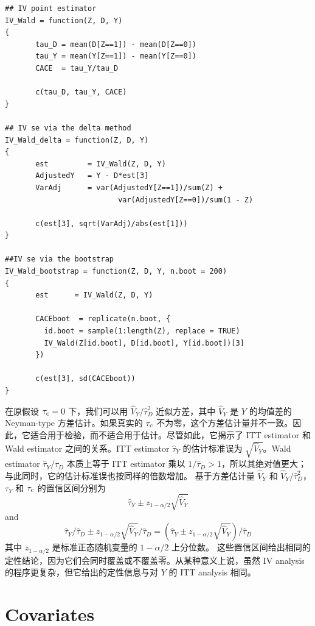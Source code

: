 \begin{lstlisting}
## IV point estimator
IV_Wald = function(Z, D, Y)
{
       tau_D = mean(D[Z==1]) - mean(D[Z==0])
       tau_Y = mean(Y[Z==1]) - mean(Y[Z==0])
       CACE  = tau_Y/tau_D
       
       c(tau_D, tau_Y, CACE)
}

## IV se via the delta method
IV_Wald_delta = function(Z, D, Y)
{
       est         = IV_Wald(Z, D, Y)
       AdjustedY   = Y - D*est[3]
       VarAdj      = var(AdjustedY[Z==1])/sum(Z) + 
                          var(AdjustedY[Z==0])/sum(1 - Z)
       
       c(est[3], sqrt(VarAdj)/abs(est[1]))
}

##IV se via the bootstrap
IV_Wald_bootstrap = function(Z, D, Y, n.boot = 200)
{
       est      = IV_Wald(Z, D, Y)
       
       CACEboot  = replicate(n.boot, {
         id.boot = sample(1:length(Z), replace = TRUE)
         IV_Wald(Z[id.boot], D[id.boot], Y[id.boot])[3]
       })
       
       c(est[3], sd(CACEboot))
}
\end{lstlisting}


在原假设 $\tau_{\textup{c}} = 0$ 下，我们可以用 $\hat{V}_Y /  \hat{\tau}_D ^2$ 近似方差，其中 $\hat{V}_Y$ 是 $Y$ 的均值差的 Neyman-type 方差估计。如果真实的 $\tau_{\textup{c}}$ 不为零，这个方差估计量并不一致。因此，它适合用于检验，而不适合用于估计。尽管如此，它揭示了 ITT estimator 和 Wald estimator 之间的关系。ITT estimator $\hat{\tau}_Y$ 的估计标准误为 $\sqrt{ \hat{V}_Y}$。Wald estimator $ \hat{\tau}_Y / \hat{\tau}_D$ 本质上等于 ITT estimator 乘以 $1/\hat{\tau}_D > 1$，所以其绝对值更大；与此同时，它的估计标准误也按同样的倍数增加。
基于方差估计量 $\hat{V}_Y $ 和 $\hat{V}_Y /  \hat{\tau}_D ^2$，$\tau_Y$ 和 $\tau_{\textup{c}}$ 的置信区间分别为
$$
\hat{\tau}_Y \pm z_{1-\alpha/2} \sqrt{ \hat{V}_Y}
$$
and
$$
\hat{\tau}_Y  / \hat{\tau}_D \pm z_{1-\alpha/2} \sqrt{ \hat{V}_Y}  / \hat{\tau}_D
= 
\left( \hat{\tau}_Y \pm z_{1-\alpha/2} \sqrt{ \hat{V}_Y}  \right) / \hat{\tau}_D 
$$
其中 $z_{1-\alpha/2}$ 是标准正态随机变量的 $1-\alpha/2$ 上分位数。
这些置信区间给出相同的定性结论，因为它们会同时覆盖或不覆盖零。从某种意义上说，虽然 IV analysis 的程序更复杂，但它给出的定性信息与对 $Y$ 的 ITT analysis 相同。




\section{Covariates}


